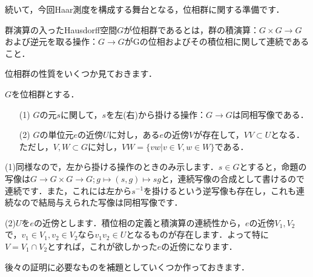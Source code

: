 続いて，今回Haar測度を構成する舞台となる，位相群に関する準備です．

\begin{defi}[位相群]\label{12}
群演算の入ったHausdorff空間$G$が位相群であるとは，群の積演算：$G \times G \to G$および逆元を取る操作：$G \to G$がGの位相およびその積位相に関して連続であること．
\end{defi}
位相群の性質をいくつか見ておきます．
\begin{prop}[位相群の性質]\label{13}
$G$を位相群とする．
\begin{itemize}
 \item[(1)]$G$の元$s$に関して，$s$を左(右)から掛ける操作：$G \to G$は同相写像である．
 \item[(2)]$G$の単位元$e$の近傍$U$に対し，ある$e$の近傍$V$が存在して，$VV \subset U$となる．ただし，$V,W \subset G$に対し，$VW= \{ vw | v \in V, w \in W \}$である．
\end{itemize}
\end{prop}
\begin{Proof}
(1)同様なので，左から掛ける操作のときのみ示します．$s \in G$とすると，命題の写像は$G \to G \times G \to G ; g \mapsto (s,g) \mapsto sg$と，連続写像の合成として書けるので連続です．また，これには左から$s^{-1}$を掛けるという逆写像も存在し，これも連続なので結局与えられた写像は同相写像です．

(2)$U$を$e$の近傍とします．積位相の定義と積演算の連続性から，$e$の近傍$V_1, V_2$で，$v_{1} \in V_1, v_{2} \in V_2$なら$v_{1}v_{2} \in U$となるものが存在します．よって特に$V=V_1 \cap V_2$とすれば，これが欲しかった$e$の近傍になります．
\end{Proof}
後々の証明に必要なものを補題としていくつか作っておきます．

